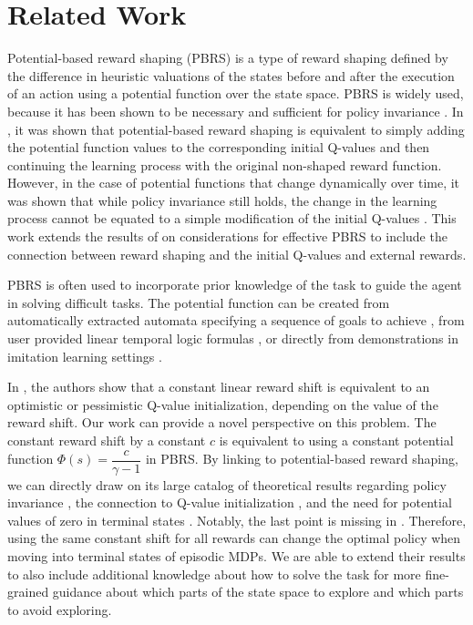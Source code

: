 \section{Related Work}
Potential-based reward shaping (PBRS) is a type of reward shaping defined by the difference in heuristic valuations of the states before and after the execution of an action using a potential function over the state space. PBRS is widely used, because it has been shown to be necessary and sufficient for policy invariance \citep{ng1999invariance}. 
In \citet{wiewiora2011Qinitialization}, it was shown that potential-based reward shaping is equivalent to simply adding the potential function values to the corresponding initial Q-values and then continuing the learning process with the original non-shaped reward function. However, in the case of potential functions that change dynamically over time, it was shown that while policy invariance still holds, the change in the learning process cannot be equated to a simple modification of the initial Q-values \citep{devlin2012dynamicPBRS}.
This work extends the results of \citet{grzes2009potential-function-analysis} on considerations for effective PBRS to include the connection between reward shaping and the initial Q-values and external rewards.

PBRS is often used to incorporate prior knowledge of the task to guide the agent in solving difficult tasks. The potential function can be created from automatically extracted automata specifying a sequence of goals to achieve \citep{Hasanbeig2021DeepSynthAS}, from user provided linear temporal logic formulas \citep{elbarbari2022tlrl}, or directly from demonstrations in imitation learning settings \citep{wang2023dshape, brys2015demonstration, suay2016demonstration, wu2021demonstrations}.

In \citet{sun2022optimistic}, the authors show that a constant linear reward shift is equivalent to an optimistic or pessimistic Q-value initialization, depending on the value of the reward shift. Our work can provide a novel perspective on this problem. The constant reward shift by a constant $c$ is equivalent to using a constant potential function $\Phi(s)= \dfrac{c}{\gamma - 1}$ in PBRS. By linking to potential-based reward shaping, we can directly draw on its large catalog of theoretical results regarding policy invariance \citep{ng1999invariance}, the connection to Q-value initialization \citep{wiewiora2011Qinitialization}, and the need for potential values of zero in terminal states \citep{grzes2017episodicPBRS}. Notably, the last point is missing in \citet{sun2022optimistic}. 
Therefore, using the same constant shift for all rewards can change the optimal policy when moving into terminal states of episodic MDPs. We are able to extend their results to also include additional knowledge about how to solve the task for more fine-grained guidance about which parts of the state space to explore and which parts to avoid exploring.

